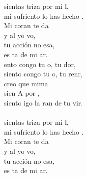 \begin{cancion}%
	 sientas  triza por mi l, \\
	mi sufriento lo has hecho . \\
	Mi coran te da \\
	y al yo vo, \\
	tu acción no esa,\\
	es ta de mi ar.\\
	ento congo tu o, tu dor,\\
	siento congo tu o, tu renr,\\
	creo que mima \\
	sien A por ,\\
	siento igo la ran de tu vir.\\
{}\vspace*{-0.4cm}\\
	 sientas  triza por mi l, \\
	mi sufriento lo has hecho . \\
	Mi coran te da \\
	y al yo vo, \\
	tu acción no esa,\\
	es ta de mi ar.\\
\end{cancion}%
